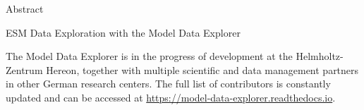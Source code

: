 \begin{frame}[t, allowframebreaks]{Abstract}
\begin{block}{ESM Data Exploration with the Model Data Explorer}
\begin{small}
            The Model Data Explorer is in the progress of development at the
			Helmholtz-Zentrum Hereon, together with multiple scientific and
			data management partners in other German research centers. The full
			list of contributors is constantly updated and can be accessed at
			\url{https://model-data-explorer.readthedocs.io}.

		\end{small}
	\end{block}
\end{frame}

